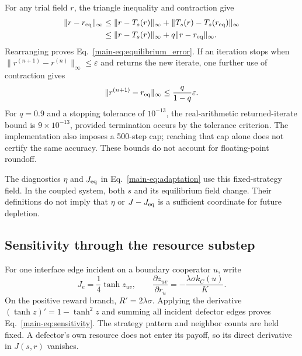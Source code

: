 For any trial field $r$, the triangle inequality and contraction give
\begin{equation}
\label{eq:residual_proof}
\begin{aligned}
\|r-r_{\rm eq}\|_\infty
&\le\|r-T_s(r)\|_\infty
  +\|T_s(r)-T_s(r_{\rm eq})\|_\infty\\
&\le\|r-T_s(r)\|_\infty+q\|r-r_{\rm eq}\|_\infty.
\end{aligned}
\end{equation}
Rearranging proves Eq.~\eqref{main-eq:equilibrium_error}. If an iteration stops when $\|r^{(n+1)}-r^{(n)}\|_\infty\le\varepsilon$ and returns the new iterate, one further use of contraction gives
\begin{equation}
\label{eq:returned_error}
\|r^{(n+1)}-r_{\rm eq}\|_\infty
\le\frac{q}{1-q}\varepsilon.
\end{equation}
For $q=0.9$ and a stopping tolerance of $10^{-13}$, the real-arithmetic returned-iterate bound is $9\times10^{-13}$, provided termination occurs by the tolerance criterion. The implementation also imposes a 500-step cap; reaching that cap alone does not certify the same accuracy. These bounds do not account for floating-point roundoff.

The diagnostics $\eta$ and $J_{\rm eq}$ in Eq.~\eqref{main-eq:adaptation} use this fixed-strategy field. In the coupled system, both $s$ and its equilibrium field change. Their definitions do not imply that $\eta$ or $J-J_{\rm eq}$ is a sufficient coordinate for future depletion.

\subsection{Sensitivity through the resource substep}

For one interface edge incident on a boundary cooperator $u$, write
\begin{equation}
\label{eq:edge_derivative}
J_e=\frac14\tanh z_{uv},
\qquad
\frac{\partial z_{uv}}{\partial r_u}
=-\frac{\lambda\sigma k_C(u)}{K}.
\end{equation}
On the positive reward branch, $R'=2\lambda\sigma$. Applying the derivative $(\tanh z)'=1-\tanh^2z$ and summing all incident defector edges proves Eq.~\eqref{main-eq:sensitivity}. The strategy pattern and neighbor counts are held fixed. A defector's own resource does not enter its payoff, so its direct derivative in $J(s,r)$ vanishes.

